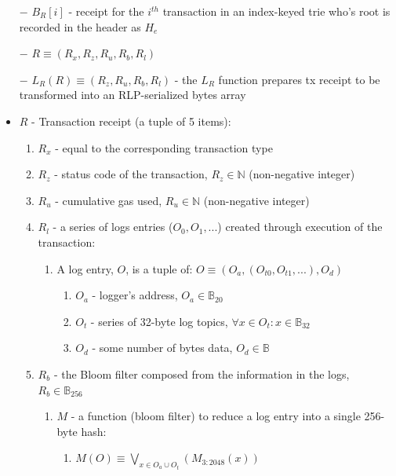 \documentclass{article}
\begin{document}
\begin{itemize}
    \item[$-$] $B_R[i]$ - receipt for the $i^{th}$  transaction in an index-keyed trie who's root is recorded in the header as $H_e$
    \item[$-$] $R  \equiv (R_x, R_z, R_u, R_b, R_l)$
    \item[$-$] $L_R(R) \equiv (R_z, R_u, R_b, R_l)$ - the $L_R$ function prepares tx receipt to be transformed into an RLP-serialized bytes array
    \item $R$ - Transaction receipt (a tuple of 5 items):

    \begin{enumerate}
        \item $R_x$ - equal to the corresponding transaction type
        \item $R_z$ - status code of the transaction, $R_z \in \mathbb{N}$ (non-negative integer)
        \item $R_u$ - cumulative gas used, $R_u \in \mathbb{N}$ (non-negative integer)
        \item $R_l$ - a series of logs entries ($O_0, O_1,...$) created through execution of the transaction:
        \begin{enumerate}
            \item A log entry, $O$, is a tuple of: $O \equiv (O_a, (O_{t0}, O_{t1},...), O_d)$ 
            \begin{enumerate}
                \item $O_a$ - logger's  address,  $O_a \in \mathbb{B}_{20}$ 
                \item $O_t$ - series of 32-byte log topics, $\forall x \in O_t : x \in \mathbb{B}_{32}$
                \item $O_d$ - some number of bytes data, $O_d \in \mathbb{B}$
            \end{enumerate}
        \end{enumerate}
        \item $R_b$ - the Bloom filter composed from the information in the logs, $R_b \in \mathbb{B}_{256}$
        \begin{enumerate}
            \item $M$ - a function (bloom filter) to reduce a log entry into a single 256-byte hash:
            \begin{enumerate}
                \item $M(O) \equiv \bigvee _{x \in {O_a}\cup O_t}(M_{3:2048}(x))$
                \begin{enumerate}

\end{enumerate}
\end{enumerate}
\end{enumerate}
\end{enumerate}
\end{itemize}
\end{document}
